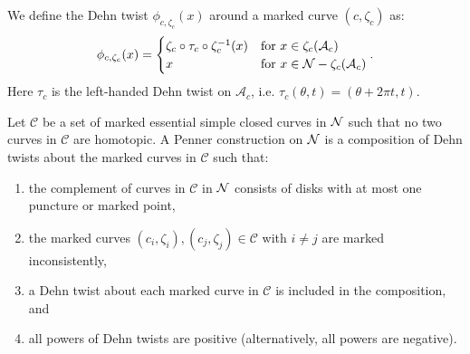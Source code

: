  We define the Dehn twist $\phi_{c,\zeta_c}(x)$ around a marked curve $(c,\zeta_c)$ as:
\begin{align*}
  \phi_{c,\zeta_c}(x) =
  \begin{cases}
    \zeta_c \circ \tau_c \circ \zeta_c^{-1}(x) & \text{for } x \in \zeta_c(\mathcal{A}_c) \\
    x & \text{for } x \in \mathcal{N} - \zeta_c(\mathcal{A}_c)
  \end{cases}.
\end{align*}
Here $\tau_c$ is the left-handed Dehn twist on $\mathcal{A}_c$, i.e. $\tau_c(\theta,t) = (\theta + 2\pi t,t)$.

 Let $\mathcal{C}$ be a set of marked essential simple closed curves in $\mathcal{N}$ such that no two curves in $\mathcal{C}$ are homotopic.  A Penner construction on $\mathcal{N}$ is a composition of Dehn twists about the marked curves in $\mathcal{C}$ such that:
\begin{enumerate}
\item the complement of curves in $\mathcal{C}$ in $\mathcal{N}$ consists of disks with at most one puncture or marked point,
    \item the marked curves $(c_i,\zeta_i),(c_j,\zeta_j)\in\mathcal{C}$ with $i\neq j$ are marked inconsistently,
    \item a Dehn twist about each marked curve in $\mathcal{C}$ is included in the composition, and
    \item all powers of Dehn twists are positive (alternatively, all powers are negative).
\end{enumerate}




